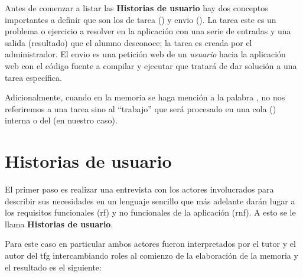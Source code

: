 \documentclass[11pt,spanish,listoffigures,listoftables]{tfgetsinf}
\begin{document}
Antes de comenzar a listar las \textbf{Historias de usuario} hay dos conceptos importantes a definir que son los de \gls{tarea} () y \gls{envio} (). La \gls{tarea} este es un problema o ejercicio a resolver en la aplicación con una serie de entradas y una salida (resultado) que el \gls{alumno} desconoce; la \gls{tarea} es creada por el \gls{administrador}. El \gls{envio} es una petición web de un \textit{usuario} hacia la aplicación web con el código fuente a compilar y ejecutar que tratará de dar solución a una \gls{tarea} específica. 

Adicionalmente, cuando en la memoria se haga mención a la palabra , no nos referiremos a una \gls{tarea} sino al ``trabajo'' que será procesado en una cola () interna o del  (\kahan en nuestro caso).

\section{Historias de usuario}

El primer paso es realizar una entrevista con los actores involucrados para describir sus necesidades en un lenguaje sencillo que más adelante darán lugar a los requisitos funcionales (\acrshort{rf})  y no funcionales de la aplicación (\acrshort{rnf}). A esto se le llama \textbf{Historias de usuario}. \par

Para este caso en particular ambos actores fueron interpretados por el tutor y el autor del \acrshort{tfg} intercambiando roles al comienzo de la elaboración de la memoria y el resultado es el siguiente:
\end{document}

